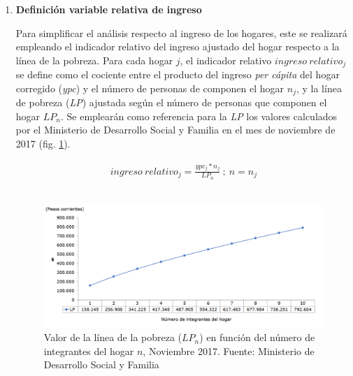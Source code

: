 \documentclass[12pt,letterpaper,spanish]{article}
\begin{document}
\begin{enumerate}
    


\item \textbf{Definición variable relativa de ingreso}

Para simplificar el análisis respecto al ingreso de los hogares, este se realizará empleando el indicador relativo del ingreso ajustado del hogar respecto a la línea de la pobreza. Para cada hogar $j$, el indicador relativo $ingreso\:relativo_{j}$ se define como el cociente entre el producto del ingreso \textit{per cápita} del hogar corregido (\textit{ypc}) y el número de personas de componen el hogar $n_{j}$,  y la línea de pobreza (\textit{LP}) ajustada según el número de personas que componen el hogar $LP_n$. Se emplearán como referencia para la \textit{LP} los valores calculados por el Ministerio de Desarrollo Social y Familia en el mes de noviembre de 2017 (fig. \ref{LPLPE}).

\begin{equation} \label{calculophi}
\begin{split}
ingreso\:relativo_{j}=\frac{ypc_{j}*n_{j}}{LP_{n}}\: ;\:n=n_{j}
\end{split}
\end{equation}\\




\begin{figure}[H]
    \centering
    \includegraphics[width=\textwidth]{Max/linea_pobreza.png}
    \caption{Valor de la línea de la pobreza ($LP_n$) en función del número de integrantes del hogar $n$, Noviembre 2017. Fuente: Ministerio de Desarrollo Social y Familia}
    \label{LPLPE}
\end{figure}


\end{enumerate}
\end{document}
